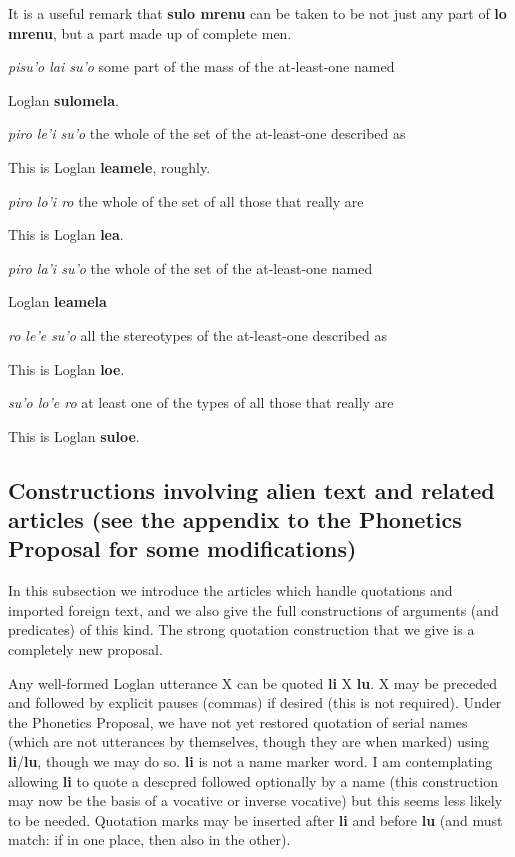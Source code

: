 \documentclass[12pt]{book}
\begin{document}
{\begin{description}
It is a useful remark that {\bf sulo mrenu} can be taken to be not just any part of {\bf lo mrenu}, but a part made up of complete men.

\item[lai: ]	{\em pisu'o lai su'o \/}	some part of the mass of the at-least-one named

Loglan {\bf sulomela}.

\item[le'i: ]	{\em piro le'i su'o \/}	the whole of the set of the at-least-one described as

This is Loglan {\bf leamele}, roughly.

\item[lo'i: ]	{\em piro lo'i ro \/}	 the whole of the set of all those that really are

This is Loglan {\bf lea}.

\item[la'i: ]	{\em piro la'i su'o\/}  	the whole of the set of the at-least-one named

Loglan {\bf leamela}

\item[le'e: ]	{\em ro le'e su'o\/} 	all the stereotypes of the at-least-one described as

This is Loglan {\bf loe}.

\item[lo'e: ]	{\em su'o lo'e ro\/} 	at least one of the types of all those that really are

This is Loglan {\bf suloe}.

\end{description}

\subsection{Constructions involving alien text and related articles (see the appendix to the Phonetics Proposal for some modifications)}

In this subsection we introduce the articles which handle quotations and imported foreign text, and we also give the full constructions of arguments (and predicates) of this kind.   The strong quotation construction that we give is a completely new proposal.

Any well-formed Loglan utterance X can be quoted {\bf li} X {\bf lu}.  X may be preceded and followed by explicit pauses (commas) if desired (this is not required).  Under the Phonetics Proposal, we have not yet restored quotation of serial names (which are not utterances by themselves, though they are when marked) using {\bf li}/{\bf lu}, though we may do so.  {\bf li} is not a name marker word.
I am contemplating allowing {\bf li} to quote a descpred followed optionally by a name (this construction may now be the basis of a vocative or inverse vocative) but this seems less likely to be needed.  Quotation marks may be inserted after {\bf li} and before {\bf lu} (and must match:  if in one place, then also in the other).

}
\end{document}
